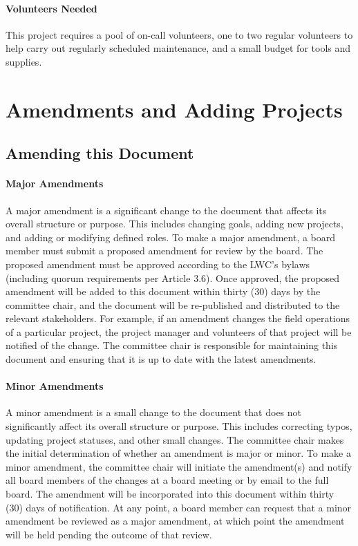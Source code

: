 \documentclass[letterpaper,11pt,leqno]{article}
\begin{document}
\paragraph{Volunteers Needed} This project requires a pool of on-call volunteers, one to two regular volunteers to help carry out regularly scheduled maintenance, and a small budget for tools and supplies.

\section{Amendments and Adding Projects}\label{s:amendments}
\subsection{Amending this Document}\label{s:amendingDoc}

\paragraph{Major Amendments} A major amendment is a significant change to the document that affects its overall structure or purpose. This includes changing goals, adding new projects, and adding or modifying defined roles.
To make a major amendment, a board member must submit a proposed amendment for review by the board. The proposed amendment must be approved according to the LWC's bylaws (including quorum requirements per Article 3.6).
Once approved, the proposed amendment will be added to this document within thirty (30) days by the committee chair, and the document will be re-published and distributed to the relevant stakeholders.
For example, if an amendment changes the field operations of a particular project, the project manager and volunteers of that project will be notified of the change.
The committee chair is responsible for maintaining this document and ensuring that it is up to date with the latest amendments.

\paragraph{Minor Amendments} A minor amendment is a small change to the document that does not significantly affect its overall structure or purpose. This includes correcting typos, updating project statuses, and other small changes.
The committee chair makes the initial determination of whether an amendment is major or minor. To make a minor amendment, the committee chair will initiate the amendment(s) and notify all board members of the changes at a board meeting or by email to the full board. The amendment will be incorporated into this document within thirty (30) days of notification. At any point, a board member can request that a minor amendment be reviewed as a major amendment, at which point the amendment will be held pending the outcome of that review.
\end{document}
